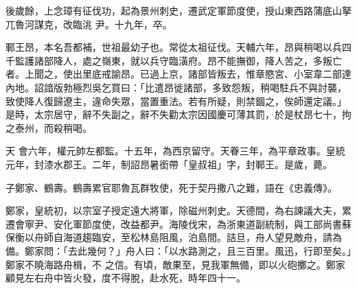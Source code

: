 \begin{pinyinscope}
 後歲餘，上念璋有征伐功，起為景州刺史，遷武定軍節度使，授山東西路蒲底山拏兀魯河謀克，改臨洮
 尹。十九年，卒。



 鄆王昂，本名吾都補，世祖最幼子也。常從太祖征伐。天輔六年，昂與稍喝以兵四千監護諸部降人，處之嶺東，就以兵守臨潢府。昂不能撫御，降人苦之，多叛亡者。上聞之，使出里底戒諭昂。已過上京，諸部皆叛去，惟章愍宮、小室韋二部達內地。詔諳版勃極烈吳乞買曰：「比遣昂徙諸部，多致怨叛，稍喝駐兵不與討襲，致使降人復歸遼主，違命失眾，當置重法。若有所疑，則禁錮之，俟師還定議。」是時，太宗居守，辭不失副之，辭不失勸太宗因國慶可薄其罰，於是杖昂七十，拘之泰州，而殺稍喝。



 天
 會六年，權元帥左都監。十五年，為西京留守。天眷三年，為平章政事。皇統元年，封漆水郡王。二年，制詔昂暑銜帶「皇叔祖」字，封鄆王。是歲，薨。



 子鄭家、鶴壽。鶴壽累官耶魯瓦群牧使，死于契丹撒八之難，語在《忠義傳》。



 鄭家，皇統初，以宗室子授定遠大將軍，除磁州刺史。天德間，為右諫議大夫，累遷會寧尹、安化軍節度使，改益都尹。海陵伐宋，為浙東道副統制，與工部尚書蘇保衡以舟師自海道趨臨安，至松林島阻風，泊島間。詰旦，舟人望見敵舟，請為備。鄭家問：「去此幾何？」舟人曰：「以水路測之，且三百里。風迅，行即至矣。」鄭家不曉海路舟楫，不
 之信。有頃，敵果至，見我軍無備，即以火砲擲之。鄭家顧見左右舟中皆火發，度不得脫，赴水死，時年四十一。



\end{pinyinscope}